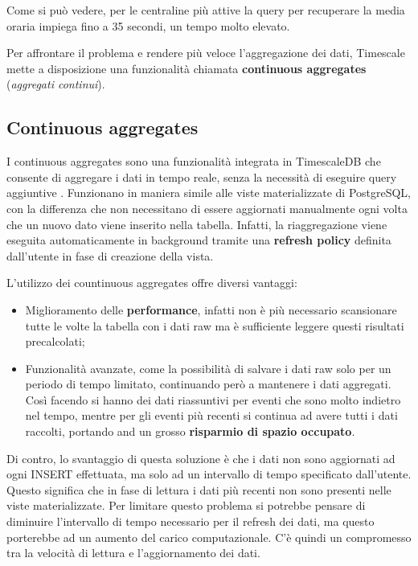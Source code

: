 Come si può vedere, per le centraline più attive la query per recuperare la media oraria impiega fino a 35 secondi, un tempo molto elevato.

Per affrontare il problema e rendere più veloce l'aggregazione dei dati, Timescale mette a disposizione una funzionalità chiamata \textbf{continuous aggregates} (\textit{aggregati continui}).

\subsection{Continuous aggregates}\label{ssec:cont-aggr}
I continuous aggregates sono una funzionalità integrata in TimescaleDB che consente di aggregare i dati in tempo reale, senza la necessità di eseguire query aggiuntive \cite{timescale_ca_2}. Funzionano in maniera simile alle viste materializzate di PostgreSQL, con la differenza che non necessitano di essere aggiornati manualmente ogni volta che un nuovo dato viene inserito nella tabella. Infatti, la riaggregazione viene eseguita automaticamente in background tramite una \textbf{refresh policy} definita dall'utente in fase di creazione della vista.

L’utilizzo dei countinuous aggregates offre diversi vantaggi:
\begin{itemize}
  \item Miglioramento delle \textbf{performance}, infatti non è più necessario scansionare tutte le volte la tabella con i dati raw ma è sufficiente leggere questi risultati precalcolati;
  \item Funzionalità avanzate, come la possibilità di salvare i dati raw solo per un periodo di tempo limitato, continuando però a mantenere i dati aggregati. Così facendo si hanno dei dati riassuntivi per eventi che sono molto indietro nel tempo, mentre per gli eventi più recenti si continua ad avere tutti i dati raccolti, portando and un grosso \textbf{risparmio di spazio occupato}.
\end{itemize}

Di contro, lo svantaggio di questa soluzione è che i dati non sono aggiornati ad ogni INSERT effettuata, ma solo ad un intervallo di tempo specificato dall’utente. Questo significa che in fase di lettura i dati più recenti non sono presenti nelle viste materializzate. Per limitare questo problema si potrebbe pensare di diminuire l’intervallo di tempo necessario per il refresh dei dati, ma questo porterebbe ad un aumento del carico computazionale. C'è quindi un compromesso tra la velocità di lettura e l’aggiornamento dei dati. \cite{tesi_polito_2}

